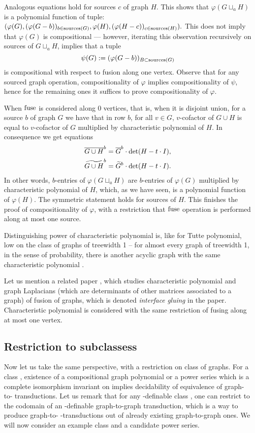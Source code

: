 Analogous equations hold for sources $c$ of graph $H$. 
This shows that
$
\varphi(G \sqcup_a H)$ is a polynomial function of tuple: $(\varphi(G), (\varphi(G-b))_{b\in\operatorname{sources}(G)}, \varphi(H), (\varphi(H-c))_{c\in \operatorname{sources}(H)}).
$
This does not imply that $\varphi(G)$ is compositional --- however, iterating this observation recursively on sources of $G\sqcup_a H$, implies that a tuple
$$\psi(G) := (\varphi(G-b))_{B\subset\operatorname{sources}(G)}$$ is compositional with respect to fusion along one vertex. Observe that for any sourced graph operation, compositionality of $\varphi$ implies compositionality of $\psi$, hence for the remaining ones it suffices to prove compositionality of $\varphi$.

When $\operatorname{fuse}$ is considered along 0 vertices, that is, when it is disjoint union, for a source $b$ of graph $G$ we have that in row $b$, for all $v \in G$, $v$-cofactor of $G \cup H$ is equal to $v$-cofactor of $G$ multiplied by characteristic polynomial of $H$. In consequence we get equations 
\begin{align*}
\overline{G\cup H}^{b} = \overline{G}^{b} \cdot \det(H - t\cdot I), \\
\widetilde{G\cup H}^{b} = \widetilde{G}^{b} \cdot \det(H - t\cdot I).
\end{align*}
In other words, $b$-entries of $\varphi(G \sqcup_a H)$ are $b$-entries of $\varphi(G)$ multiplied by characteristic polynomial of $H$, which, as we have seen, is a polynomial function of $\varphi(H)$. The symmetric statement holds for sources of $H$. This finishes the proof of compositionality of $\varphi$, with a restriction that $\operatorname{fuse}$ operation is performed along at most one source.

Distinguishing power of characteristic polynomial is, like for Tutte polynomial, low on the class of graphs of treewidth 1 -- for almost every graph of treewidth 1, in the sense of probability, there is another acyclic graph with the same characteristic polynomial \cite{schwenkCospectral73}.

Let us mention a related paper \cite{contrerasGluingLaplacians20}, which studies characteristic polynomial and graph Laplacians (which are determinants of other matrices associated to a graph) of fusion of graphs, which is denoted \emph{interface gluing} in the paper. Characteristic polynomial is considered with the same restriction of fusing along at most one vertex.
\subsection{Restriction to subclassess}
Now let us take the same perspective, with a restriction on class of graphs. For a class \Cc, existence of a compositional graph polynomial or a power series which is a complete isomorphism invariant on \Cc implies decidability of equivalence of graph-to-\Cc {} \mso transductions.
Let us remark that for any \mso-definable class \Cc, one can restrict to \Cc the codomain of an \mso-definable graph-to-graph transduction, which is a way to produce graph-to-\Cc {} \mso-transductions out of already existing graph-to-graph ones.
We will now consider an example class and a candidate power series.

